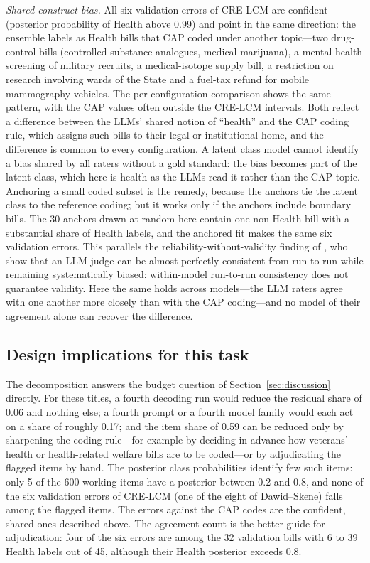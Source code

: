 \emph{Shared construct bias.} All six validation errors of CRE-LCM are confident (posterior
probability of Health above 0.99) and point in the same direction: the ensemble labels as Health
bills that CAP coded under another topic---two drug-control bills (controlled-substance analogues,
medical marijuana), a mental-health screening of military recruits, a medical-isotope supply bill,
a restriction on research involving wards of the State and a fuel-tax refund for mobile
mammography vehicles. The per-configuration comparison shows the same pattern, with the CAP values
often outside the CRE-LCM intervals. Both reflect a difference between the LLMs' shared notion of
``health'' and the CAP coding rule, which assigns such bills to their legal or institutional home,
and the difference is common to every configuration. A latent class model cannot identify a bias
shared by all raters without a gold standard: the bias becomes part of the latent class, which here
is health as the LLMs read it rather than the CAP topic. Anchoring a small coded subset is the
remedy, because the anchors tie the latent class to the reference coding; but it works only if the
anchors include boundary bills. The 30 anchors drawn at random here contain one non-Health bill
with a substantial share of Health labels, and the anchored fit makes the same six validation
errors. This parallels the reliability-without-validity finding of \citet{Norman2026}, who show that an LLM judge can be almost perfectly consistent from run to run while remaining systematically biased: within-model run-to-run consistency does not guarantee validity. Here the same holds across models---the LLM raters agree with one another more closely than with the CAP coding---and no model of their agreement alone can recover the difference.

\subsection{Design implications for this task}\label{sec:app_design_implications}

The decomposition answers the budget question of Section~\ref{sec:discussion} directly. For these
titles, a fourth decoding run would reduce the residual share of 0.06 and nothing else; a fourth
prompt or a fourth model family would each act on a share of roughly 0.17; and the item share of
0.59 can be reduced only by sharpening the coding rule---for example by deciding in advance how
veterans' health or health-related welfare bills are to be coded---or by adjudicating the flagged
items by hand. The posterior class probabilities identify few such items: only 5 of the 600
working items have a posterior between 0.2 and 0.8, and none of the six validation errors of
CRE-LCM (one of the eight of Dawid--Skene) falls among the flagged items. The errors against the
CAP codes are the confident, shared ones described above. The agreement count is the better guide for
adjudication: four of the six errors are among the 32 validation bills with 6 to 39 Health labels
out of 45, although their Health posterior exceeds 0.8.

